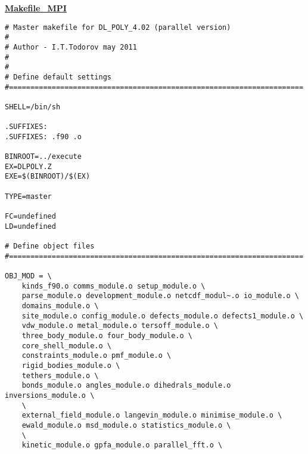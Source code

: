 \clearpage
{\sc \bf \underline{Makefile\_MPI}}
\begin{verbatim}
# Master makefile for DL_POLY_4.02 (parallel version)
#
# Author - I.T.Todorov may 2011
#
#
# Define default settings
#=====================================================================

SHELL=/bin/sh

.SUFFIXES:
.SUFFIXES: .f90 .o

BINROOT=../execute
EX=DLPOLY.Z
EXE=$(BINROOT)/$(EX)

TYPE=master

FC=undefined
LD=undefined

# Define object files
#=====================================================================

OBJ_MOD = \
	kinds_f90.o comms_module.o setup_module.o \
	parse_module.o development_module.o netcdf_modul~.o io_module.o \
	domains_module.o \
	site_module.o config_module.o defects_module.o defects1_module.o \
	vdw_module.o metal_module.o tersoff_module.o \
	three_body_module.o four_body_module.o \
	core_shell_module.o \
	constraints_module.o pmf_module.o \
	rigid_bodies_module.o \
	tethers_module.o \
	bonds_module.o angles_module.o dihedrals_module.o inversions_module.o \
	\
	external_field_module.o langevin_module.o minimise_module.o \
	ewald_module.o msd_module.o statistics_module.o \
	\
	kinetic_module.o gpfa_module.o parallel_fft.o \


\end{verbatim}
